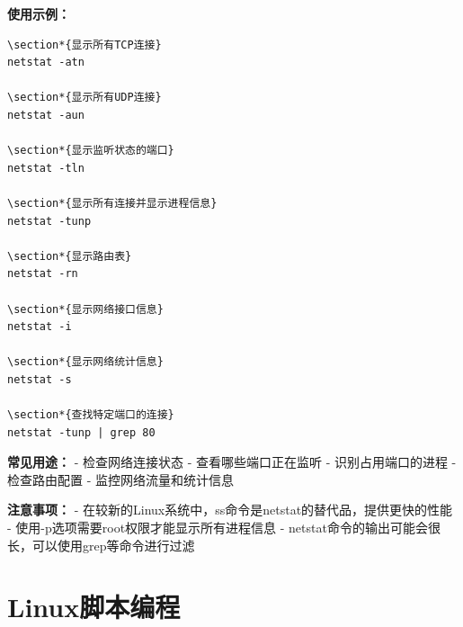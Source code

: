 \documentclass[12pt,UTF8]{ctexbook}
\begin{document}
\textbf{使用示例：}
\begin{verbatim}
\section*{显示所有TCP连接}
netstat -atn

\section*{显示所有UDP连接}
netstat -aun

\section*{显示监听状态的端口}
netstat -tln

\section*{显示所有连接并显示进程信息}
netstat -tunp

\section*{显示路由表}
netstat -rn

\section*{显示网络接口信息}
netstat -i

\section*{显示网络统计信息}
netstat -s

\section*{查找特定端口的连接}
netstat -tunp | grep 80
\end{verbatim}

\textbf{常见用途：}
- 检查网络连接状态
- 查看哪些端口正在监听
- 识别占用端口的进程
- 检查路由配置
- 监控网络流量和统计信息

\textbf{注意事项：}
- 在较新的Linux系统中，ss命令是netstat的替代品，提供更快的性能
- 使用-p选项需要root权限才能显示所有进程信息
- netstat命令的输出可能会很长，可以使用grep等命令进行过滤

\chapter{Linux脚本编程}
\end{document}
